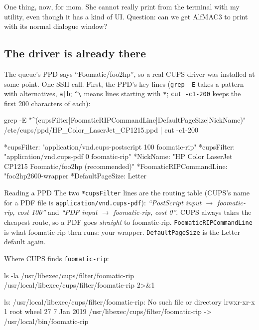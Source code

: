 \documentclass[11pt,a4paper]{article}
\begin{document}
\begin{alf}
One thing, now, for mom. She cannot really print from the terminal with my utility, even though it has a kind of UI. Question: can we get AlfMAC3 to print with its normal dialogue window?
\end{alf}

\subsection{The driver is already there}\label{sec:ppd}

The queue's PPD says ``Foomatic/foo2hp'', so a real CUPS driver was installed at some point. One SSH call. First, the PPD's key lines (\texttt{grep -E} takes a pattern with alternatives, \texttt{a|b}; \texttt{\^{}\textbackslash*} means lines starting with \texttt{*}; \texttt{cut -c1-200} keeps the first 200 characters of each):

\begin{mine}
grep -E "^\*(cupsFilter|FoomaticRIPCommandLine|DefaultPageSize|NickName)" /etc/cups/ppd/HP_Color_LaserJet_CP1215.ppd | cut -c1-200
\end{mine}
\begin{cmdout}
*cupsFilter:	"application/vnd.cups-postscript 100 foomatic-rip"
*cupsFilter:	"application/vnd.cups-pdf 0 foomatic-rip"
*NickName:      "HP Color LaserJet CP1215 Foomatic/foo2hp (recommended)"
*FoomaticRIPCommandLine: "foo2hp2600-wrapper %
*DefaultPageSize: Letter
\end{cmdout}

\begin{insight}{Reading a PPD}
The two \texttt{*cupsFilter} lines are the routing table (CUPS's name for a PDF file is \texttt{application/vnd.cups-pdf}): \textit{``PostScript input $\to$ foomatic-rip, cost 100''} and \textit{``PDF input $\to$ foomatic-rip, cost 0''}. CUPS always takes the cheapest route, so a PDF goes \emph{straight} to foomatic-rip. \texttt{FoomaticRIPCommandLine} is what foomatic-rip then runs: your wrapper. \texttt{DefaultPageSize} is the Letter default again.
\end{insight}

Where CUPS finds \texttt{foomatic-rip}:

\begin{mine}
ls -la /usr/libexec/cups/filter/foomatic-rip /usr/local/libexec/cups/filter/foomatic-rip 2>&1
\end{mine}
\begin{cmdout}
ls: /usr/local/libexec/cups/filter/foomatic-rip: No such file or directory
lrwxr-xr-x  1 root  wheel  27  7 Jan  2019 /usr/libexec/cups/filter/foomatic-rip -> /usr/local/bin/foomatic-rip
\end{cmdout}
\end{document}
